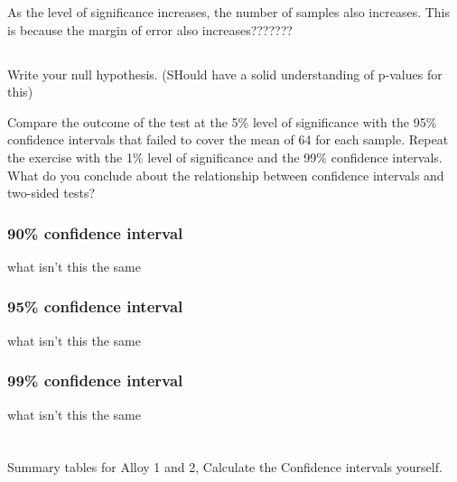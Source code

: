 \documentclass[letterpaper]{article}
\begin{document}

As the level of significance increases, the number of samples also increases.
This is because the margin of error also increases???????

\subsection{}%

Write your null hypothesis. (SHould have a solid understanding of p-values for this)

Compare the outcome of the test at the 5\% level of significance with the 95\% confidence intervals
that failed to cover the mean of 64 for each sample. Repeat the exercise with the 1\% level of
significance and the 99\% confidence intervals. What do you conclude about the relationship
between confidence intervals and two-sided tests?

\subsubsection*{90\% confidence interval}
what isn't this the same

\subsubsection*{95\% confidence interval}
what isn't this the same

\subsubsection*{99\% confidence interval}
what isn't this the same


\section{}%
Summary tables for Alloy 1 and 2, Calculate the Confidence intervals yourself.
\subsection{}%
\end{document}

